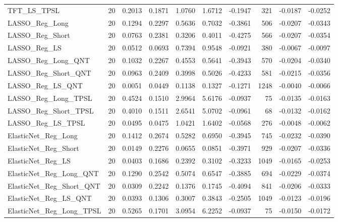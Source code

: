 \begin{tabular}{llrrrrrrrr}
\cline{1-10}
TFT\_LS\_TPSL & 20 & 0.2013 & 0.1871 & 1.0760 & 1.6712 & -0.1947 & 321 & -0.0187 & -0.0252 \\
\cline{1-10}
LASSO\_Reg\_Long & 20 & 0.1294 & 0.2297 & 0.5636 & 0.7032 & -0.3861 & 506 & -0.0207 & -0.0343 \\
\cline{1-10}
LASSO\_Reg\_Short & 20 & 0.0763 & 0.2381 & 0.3206 & 0.4011 & -0.4275 & 566 & -0.0207 & -0.0354 \\
\cline{1-10}
LASSO\_Reg\_LS & 20 & 0.0512 & 0.0693 & 0.7394 & 0.9548 & -0.0921 & 380 & -0.0067 & -0.0097 \\
\cline{1-10}
LASSO\_Reg\_Long\_QNT & 20 & 0.1032 & 0.2267 & 0.4553 & 0.5641 & -0.3943 & 570 & -0.0204 & -0.0340 \\
\cline{1-10}
LASSO\_Reg\_Short\_QNT & 20 & 0.0963 & 0.2409 & 0.3998 & 0.5026 & -0.4233 & 581 & -0.0215 & -0.0356 \\
\cline{1-10}
LASSO\_Reg\_LS\_QNT & 20 & 0.0051 & 0.0449 & 0.1138 & 0.1327 & -0.1271 & 1248 & -0.0040 & -0.0066 \\
\cline{1-10}
LASSO\_Reg\_Long\_TPSL & 20 & 0.4524 & 0.1510 & 2.9964 & 5.6176 & -0.0937 & 75 & -0.0135 & -0.0163 \\
\cline{1-10}
LASSO\_Reg\_Short\_TPSL & 20 & 0.4010 & 0.1511 & 2.6541 & 5.0702 & -0.0961 & 68 & -0.0132 & -0.0162 \\
\cline{1-10}
LASSO\_Reg\_LS\_TPSL & 20 & 0.0495 & 0.0475 & 1.0421 & 1.6402 & -0.0568 & 276 & -0.0048 & -0.0062 \\
\cline{1-10}
ElasticNet\_Reg\_Long & 20 & 0.1412 & 0.2674 & 0.5282 & 0.6950 & -0.3945 & 745 & -0.0232 & -0.0390 \\
\cline{1-10}
ElasticNet\_Reg\_Short & 20 & 0.0149 & 0.2276 & 0.0655 & 0.0851 & -0.3971 & 929 & -0.0207 & -0.0336 \\
\cline{1-10}
ElasticNet\_Reg\_LS & 20 & 0.0403 & 0.1686 & 0.2392 & 0.3102 & -0.3233 & 1049 & -0.0165 & -0.0253 \\
\cline{1-10}
ElasticNet\_Reg\_Long\_QNT & 20 & 0.1290 & 0.2542 & 0.5074 & 0.6547 & -0.3885 & 694 & -0.0229 & -0.0374 \\
\cline{1-10}
ElasticNet\_Reg\_Short\_QNT & 20 & 0.0309 & 0.2242 & 0.1376 & 0.1745 & -0.4094 & 841 & -0.0206 & -0.0333 \\
\cline{1-10}
ElasticNet\_Reg\_LS\_QNT & 20 & 0.0393 & 0.1306 & 0.3007 & 0.3843 & -0.2505 & 1049 & -0.0123 & -0.0196 \\
\cline{1-10}
ElasticNet\_Reg\_Long\_TPSL & 20 & 0.5265 & 0.1701 & 3.0954 & 6.2252 & -0.0937 & 75 & -0.0150 & -0.0172 \\

\end{tabular}
